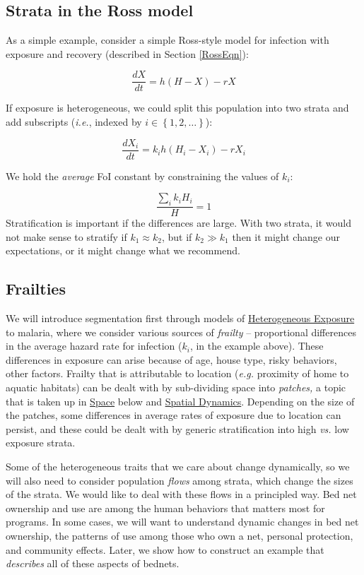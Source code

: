 \documentclass[
]{book}
\begin{document}
\hypertarget{strata-in-the-ross-model}{%
\subsection{Strata in the Ross model}\label{strata-in-the-ross-model}}

As a simple example, consider a simple Ross-style model for infection with exposure and recovery (described in Section \ref{RossEqn}):

\[\frac{dX}{dt} = h (H-X)-r X\]

If exposure is heterogeneous, we could split this population into two strata and add subscripts (\emph{i.e.}, indexed by \(i \in \left\{1,2, \ldots \right\}\)):

\[\frac{dX_i}{dt} =  k_i h (H_i -X_i)-r X_i\]

We hold the \emph{average} FoI constant by constraining the values of \(k_i\):

\[\frac{\sum_i k_i H_i}{H} = 1\]
Stratification is important if the differences are large. With two strata, it would not make sense to stratify if \(k_1 \approx k_2\), but if \(k_2 \gg k_1\) then it might change our expectations, or it might change what we recommend.

\hypertarget{frailties}{%
\subsection{Frailties}\label{frailties}}

We will introduce segmentation first through models of \protect\hyperlink{heterogeneous-exposure}{Heterogeneous Exposure} to malaria, where we consider various sources of \emph{frailty} -- proportional differences in the average hazard rate for infection (\(k_i\), in the example above). These differences in exposure can arise because of age, house type, risky behaviors, other factors. Frailty that is attributable to location (\emph{e.g.} proximity of home to aquatic habitats) can be dealt with by sub-dividing space into \emph{patches,} a topic that is taken up in \protect\hyperlink{space}{Space} below and \protect\hyperlink{spatial-dynamics}{Spatial Dynamics}. Depending on the size of the patches, some differences in average rates of exposure due to location can persist, and these could be dealt with by generic stratification into high \emph{vs.} low exposure strata.

Some of the heterogeneous traits that we care about change dynamically, so we will also need to consider population \emph{flows} among strata, which change the sizes of the strata. We would like to deal with these flows in a principled way. Bed net ownership and use are among the human behaviors that matters most for programs. In some cases, we will want to understand dynamic changes in bed net ownership, the patterns of use among those who own a net, personal protection, and community effects. Later, we show how to construct an example that \emph{describes} all of these aspects of bednets.
\end{document}

